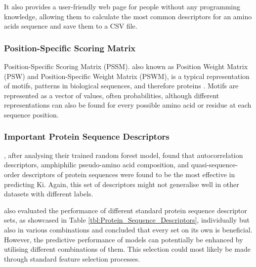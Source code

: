 It also provides a user-friendly web page \citep{ProtR_Page} for people without any programming knowledge, allowing them to calculate the most common descriptors for an amino acids sequence and save them to a CSV file.

\subsubsection{Position-Specific Scoring Matrix}
\label{subsubsec:PSSM}

Position-Specific Scoring Matrix (PSSM). also known as Position Weight Matrix (PSW) and Position-Specific Weight Matrix (PSWM), is a typical representation of motifs, patterns in biological sequences, and therefore proteins \citep{Jiang2020, Encyclopedia}. Motifs are represented as a vector of values, often probabilities, although different representations can also be found for every possible amino acid or residue at each sequence position. 

\subsubsection{Important Protein Sequence Descriptors}

\citet{Shar2016}, after analysing their trained random forest model, found that autocorrelation descriptors, amphiphilic pseudo-amino acid composition, and quasi-sequence-order descriptors of protein sequences were found to be the most effective in predicting Ki. Again, this set of descriptors might not generalise well in other datasets with different labels.

\citet{Ong2007} also evaluated the performance of different standard protein sequence descriptor sets, as showcased in Table \ref{tbl:Protein_Sequence_Descriptors}, individually but also in various combinations and concluded that every set on its own is beneficial. However, the predictive performance of models can potentially be enhanced by utilising different combinations of them. This selection could most likely be made through standard feature selection processes.

